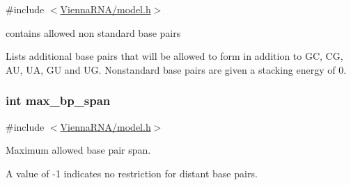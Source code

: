 {\ttfamily \#include $<$\hyperlink{model_8h}{Vienna\+R\+N\+A/model.\+h}$>$}



contains allowed non standard base pairs 

Lists additional base pairs that will be allowed to form in addition to G\+C, C\+G, A\+U, U\+A, G\+U and U\+G. Nonstandard base pairs are given a stacking energy of 0. \hypertarget{group__model__details_ga18df869af0d70101106458fc3f027806}{}
\subsubsection[{max\+\_\+bp\+\_\+span}]{\setlength{\rightskip}{0pt plus 5cm}int max\+\_\+bp\+\_\+span}\label{group__model__details_ga18df869af0d70101106458fc3f027806}


{\ttfamily \#include $<$\hyperlink{model_8h}{Vienna\+R\+N\+A/model.\+h}$>$}



Maximum allowed base pair span. 

A value of -\/1 indicates no restriction for distant base pairs. 
